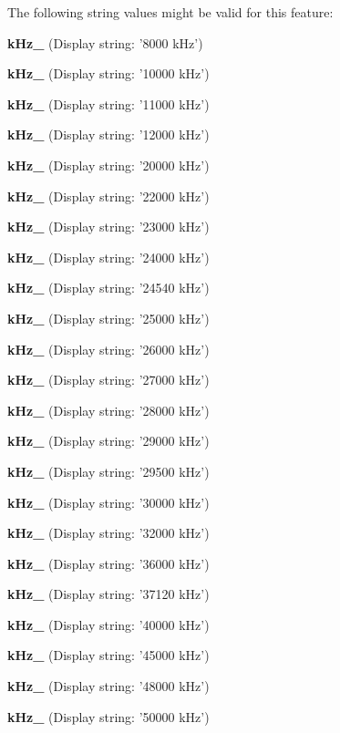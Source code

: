The following string values might be valid for this feature\+:
\begin{DoxyItemize}
\item {\bfseries k\+Hz\+\_} (Display string\+: '8000 k\+Hz')
\item {\bfseries k\+Hz\+\_} (Display string\+: '10000 k\+Hz')
\item {\bfseries k\+Hz\+\_} (Display string\+: '11000 k\+Hz')
\item {\bfseries k\+Hz\+\_} (Display string\+: '12000 k\+Hz')
\item {\bfseries k\+Hz\+\_} (Display string\+: '20000 k\+Hz')
\item {\bfseries k\+Hz\+\_} (Display string\+: '22000 k\+Hz')
\item {\bfseries k\+Hz\+\_} (Display string\+: '23000 k\+Hz')
\item {\bfseries k\+Hz\+\_} (Display string\+: '24000 k\+Hz')
\item {\bfseries k\+Hz\+\_} (Display string\+: '24540 k\+Hz')
\item {\bfseries k\+Hz\+\_} (Display string\+: '25000 k\+Hz')
\item {\bfseries k\+Hz\+\_} (Display string\+: '26000 k\+Hz')
\item {\bfseries k\+Hz\+\_} (Display string\+: '27000 k\+Hz')
\item {\bfseries k\+Hz\+\_} (Display string\+: '28000 k\+Hz')
\item {\bfseries k\+Hz\+\_} (Display string\+: '29000 k\+Hz')
\item {\bfseries k\+Hz\+\_} (Display string\+: '29500 k\+Hz')
\item {\bfseries k\+Hz\+\_} (Display string\+: '30000 k\+Hz')
\item {\bfseries k\+Hz\+\_} (Display string\+: '32000 k\+Hz')
\item {\bfseries k\+Hz\+\_} (Display string\+: '36000 k\+Hz')
\item {\bfseries k\+Hz\+\_} (Display string\+: '37120 k\+Hz')
\item {\bfseries k\+Hz\+\_} (Display string\+: '40000 k\+Hz')
\item {\bfseries k\+Hz\+\_} (Display string\+: '45000 k\+Hz')
\item {\bfseries k\+Hz\+\_} (Display string\+: '48000 k\+Hz')
\item {\bfseries k\+Hz\+\_} (Display string\+: '50000 k\+Hz')

\end{DoxyItemize}
